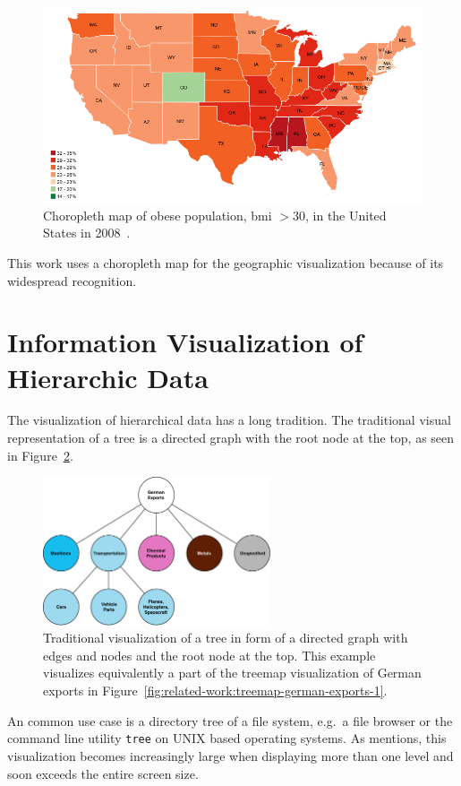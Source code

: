 \begin{figure}[ht]
  \includegraphics[width=\textwidth]{figures/related-work/choropleth}
  \caption{%
    Choropleth map of obese population, \gls{bmi} $ > 30 $, in the United States in 2008~\parencite{NCCDPHP2017}.
  }\label{fig:related-work:choropleth}
\end{figure}

This work uses a choropleth map for the geographic visualization because of its widespread recognition.

\section{Information Visualization of Hierarchic Data}
The visualization of hierarchical data has a long tradition.
The traditional visual representation of a tree is a directed graph with the root node at the top, as seen in Figure~\ref{fig:related-work:tree-graph}.
\begin{figure}[ht]
  \centering
  \includegraphics[width=0.6\textwidth]{figures/related-work/Treegraph}
  \caption{
    Traditional visualization of a tree in form of a directed graph with edges and nodes and the root node at the top.
    This example visualizes equivalently a part of the treemap visualization of German exports in Figure~\ref{fig:related-work:treemap-german-exports-1}.
  }
  \label{fig:related-work:tree-graph}
\end{figure}
An common use case is a directory tree of a file system, e.g.\ a file browser or the command line utility \texttt{tree} on UNIX based operating systems.
As \textcite{Shneiderman1992} mentions, this visualization becomes increasingly large when displaying more than one level and soon exceeds the entire screen size.

